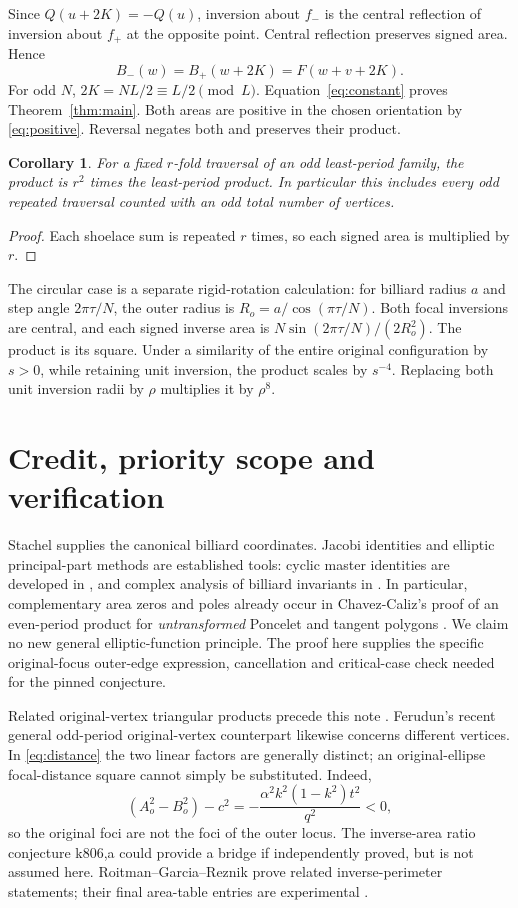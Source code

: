 \documentclass[11pt]{article}
\newtheorem{corollary}{Corollary}
\begin{document}
Since $Q(u+2K)=-Q(u)$, inversion about $f_-$ is the central reflection of inversion about $f_+$ at the opposite point. Central reflection preserves signed area. Hence
\[
 B_-(w)=B_+(w+2K)=F(w+v+2K).
\]
For odd $N$, $2K=NL/2\equiv L/2\pmod L$. Equation~\eqref{eq:constant} proves Theorem~\ref{thm:main}. Both areas are positive in the chosen orientation by \eqref{eq:positive}. Reversal negates both and preserves their product.

\begin{corollary}\label{cor:repeat}
For a fixed $r$-fold traversal of an odd least-period family, the product is $r^2$ times the least-period product. In particular this includes every odd repeated traversal counted with an odd total number of vertices.
\end{corollary}
\begin{proof}
Each shoelace sum is repeated $r$ times, so each signed area is multiplied by $r$.
\end{proof}

The circular case is a separate rigid-rotation calculation: for billiard radius $a$ and step angle $2\pi\tau/N$, the outer radius is $R_o=a/\cos(\pi\tau/N)$. Both focal inversions are central, and each signed inverse area is $N\sin(2\pi\tau/N)/(2R_o^2)$. The product is its square. Under a similarity of the entire original configuration by $s>0$, while retaining unit inversion, the product scales by $s^{-4}$. Replacing both unit inversion radii by $\rho$ multiplies it by $\rho^8$.

\section{Credit, priority scope and verification}
Stachel supplies the canonical billiard coordinates. Jacobi identities and elliptic principal-part methods are established tools: cyclic master identities are developed in \cite{KLS,KLSlocal}, and complex analysis of billiard invariants in \cite{AST}. In particular, complementary area zeros and poles already occur in Chavez-Caliz's proof of an even-period product for \emph{untransformed} Poncelet and tangent polygons \cite[Theorem~6]{CC}. We claim no new general elliptic-function principle. The proof here supplies the specific original-focus outer-edge expression, cancellation and critical-case check needed for the pinned conjecture.

Related original-vertex triangular products precede this note \cite{GR,RGH}. Ferudun's recent general odd-period original-vertex counterpart \cite{Ferudun} likewise concerns different vertices. In \eqref{eq:distance} the two linear factors are generally distinct; an original-ellipse focal-distance square cannot simply be substituted. Indeed,
\[
 (A_o^2-B_o^2)-c^2=-\frac{\alpha^2 k^2(1-k^2)t^2}{q^2}<0,
\]
so the original foci are not the foci of the outer locus. The inverse-area ratio conjecture k806,a could provide a bridge if independently proved, but is not assumed here. Roitman--Garcia--Reznik prove related inverse-perimeter statements; their final area-table entries are experimental \cite{RGR}.
\end{document}
